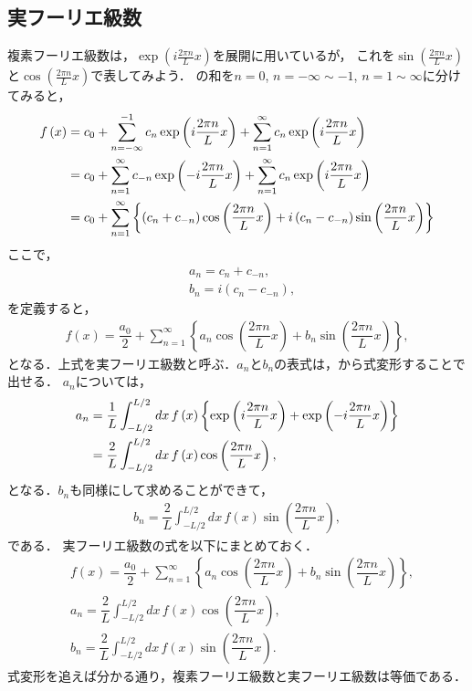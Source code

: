 \subsection{実フーリエ級数}
%
複素フーリエ級数は，$\exp(i\frac{2\pi n}{L}x)$を展開に用いているが，
これを$\sin(\frac{2\pi n}{L}x)$と$\cos(\frac{2\pi n}{L}x)$で表してみよう．
の和を$n=0$, $n=-\infty\sim -1$, $n=1\sim \infty$に分けてみると，
\begin{align}
  f\left(x\right)
  &= c_{0} + \sum_{n=-\infty}^{-1}c_n \exp\left(i\dfrac{2\pi n }{L}x\right) 
    + \sum_{n=1}^{\infty} c_n \exp\left(i\dfrac{2\pi n }{L}x\right) \notag \\
  &= c_{0} + \sum_{n=1}^{\infty}c_{-n}\exp\left(-i\dfrac{2\pi n}{L}x\right) 
   + \sum_{n=1}^{\infty}c_{n} \exp\left(i\dfrac{2\pi n}{L}x\right) \notag \\
  &= c_{0} + \sum_{n=1}^{\infty}\left\{\left(c_n + c_{-n}\right)\cos\left(\dfrac{2\pi n}{L}x\right)
           + i\left(c_n - c_{-n}\right) \sin\left(\dfrac{2\pi n}{L}x\right)\right\}
\end{align}
ここで，
\begin{align}
  & a_n = c_{n} + c_{-n}, \\
  & b_n = i\left(c_n - c_{-n}\right), 
\end{align}
を定義すると，
\begin{align}
  f\left(x\right) = \dfrac{a_0}{2} 
                  + \sum_{n=1}^{\infty}\left\{a_n \cos\left(\dfrac{2\pi n}{L}x\right)
                                             +b_n \sin\left(\dfrac{2\pi n}{L}x\right)\right\}, 
\end{align}
となる．上式を実フーリエ級数と呼ぶ．$a_n$と$b_n$の表式は，から式変形することで出せる．
$a_n$については，
\begin{align}
  a_n &= \dfrac{1}{L}\int_{-L/2}^{L/2}dx\,f\left(x\right)
        \left\{\exp\left(i\dfrac{2\pi n}{L}x\right)
        +      \exp\left(-i\dfrac{2\pi n}{L}x\right)\right\} \notag \\
      &= \dfrac{2}{L}\int_{-L/2}^{L/2}dx\,f\left(x\right)\cos\left(\dfrac{2\pi n}{L}x\right), 
\end{align}
となる．$b_n$も同様にして求めることができて，
\begin{align}
  b_n = \dfrac{2}{L}\int_{-L/2}^{L/2}dx\,f\left(x\right)\sin\left(\dfrac{2\pi n}{L}x\right), 
\end{align}
である．
実フーリエ級数の式を以下にまとめておく．
\begin{align}
 & f\left(x\right) = \dfrac{a_0}{2} 
                   + \sum_{n=1}^{\infty}\left\{a_n \cos\left(\dfrac{2\pi n}{L}x\right)
                                             +b_n \sin\left(\dfrac{2\pi n}{L}x\right)\right\}, \\ 
 & a_n = \dfrac{2}{L}\int_{-L/2}^{L/2}dx\,f\left(x\right)\cos\left(\dfrac{2\pi n}{L}x\right), \\
 & b_n = \dfrac{2}{L}\int_{-L/2}^{L/2}dx\,f\left(x\right)\sin\left(\dfrac{2\pi n}{L}x\right).
\end{align}
式変形を追えば分かる通り，複素フーリエ級数と実フーリエ級数は等価である．
%
